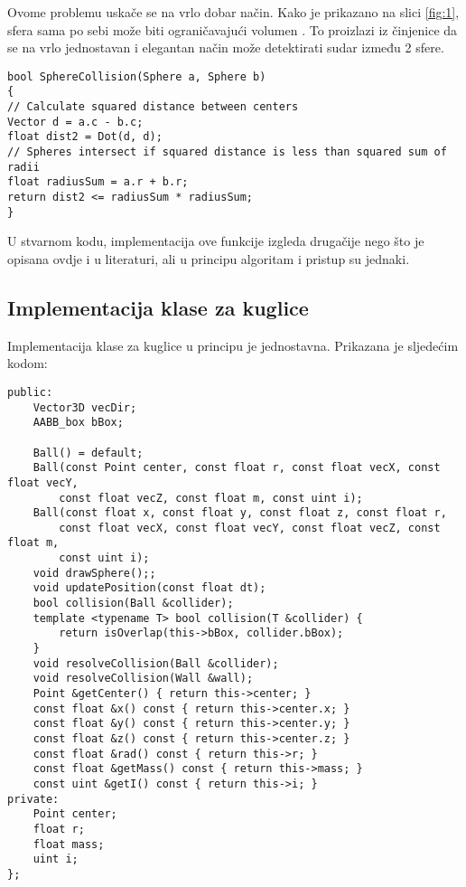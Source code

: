 Ovome problemu uskače se na vrlo dobar način. Kako je prikazano na slici \ref{fig:1}, sfera sama po sebi može biti ograničavajući volumen \cite{1}. To proizlazi iz činjenice da se na vrlo jednostavan i elegantan način može detektirati sudar između 2 sfere. 

\begin{lstlisting}[style = {myC++},label={code:6-1}, caption = {Detekcija sudara između 2 sfere\cite{1}}]
bool SphereCollision(Sphere a, Sphere b)
{
// Calculate squared distance between centers
Vector d = a.c - b.c;
float dist2 = Dot(d, d);
// Spheres intersect if squared distance is less than squared sum of radii
float radiusSum = a.r + b.r;
return dist2 <= radiusSum * radiusSum;
}
\end{lstlisting}
U stvarnom kodu, implementacija ove funkcije izgleda drugačije nego što je opisana ovdje i u literaturi\cite{1}, ali u principu algoritam i pristup su jednaki.
\newpage
\subsection{Implementacija klase za kuglice}

Implementacija klase za kuglice u principu je jednostavna. Prikazana je sljedećim kodom:

\begin{lstlisting}[style = {myC++},label={code:7}, caption = {Implementacija klase za kuglice}]
public:
	Vector3D vecDir;
	AABB_box bBox;
	
	Ball() = default;
	Ball(const Point center, const float r, const float vecX, const float vecY,
		const float vecZ, const float m, const uint i);
	Ball(const float x, const float y, const float z, const float r,
		const float vecX, const float vecY, const float vecZ, const float m,
		const uint i);	
	void drawSphere();;
	void updatePosition(const float dt);
	bool collision(Ball &collider);
	template <typename T> bool collision(T &collider) {
		return isOverlap(this->bBox, collider.bBox);
	}
	void resolveCollision(Ball &collider);
	void resolveCollision(Wall &wall);
	Point &getCenter() { return this->center; }
	const float &x() const { return this->center.x; }
	const float &y() const { return this->center.y; }
	const float &z() const { return this->center.z; }
	const float &rad() const { return this->r; }
	const float &getMass() const { return this->mass; }
	const uint &getI() const { return this->i; }
private:
	Point center;
	float r;
	float mass;
	uint i;
};

\end{lstlisting}

